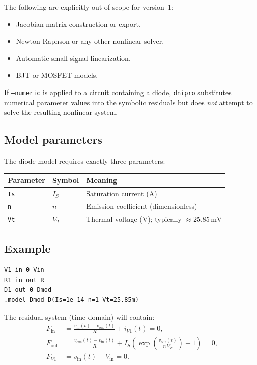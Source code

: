 \documentclass[11pt,a4paper]{article}
\newcommand{\project}{\texttt{dnipro}}
\newcommand{\code}[1]{\texttt{#1}}
\begin{document}
The following are explicitly out of scope for version~1:
\begin{itemize}[noitemsep]
    \item Jacobian matrix construction or export.
    \item Newton-Raphson or any other nonlinear solver.
    \item Automatic small-signal linearization.
    \item BJT or MOSFET models.
\end{itemize}

If \code{--numeric} is applied to a circuit containing a diode,
\project{} substitutes numerical parameter values into the symbolic residuals
but does \emph{not} attempt to solve the resulting nonlinear system.

\subsection{Model parameters}

The diode model requires exactly three parameters:

\begin{center}
\begin{tabular}{llp{}}
\toprule
Parameter & Symbol & Meaning \\
\midrule
\code{Is} & \(I_S\) & Saturation current (A) \\
\code{n}  & \(n\)   & Emission coefficient (dimensionless) \\
\code{Vt} & \(V_T\) & Thermal voltage (V); typically \(\approx 25.85\,\text{mV}\) \\
\bottomrule
\end{tabular}
\end{center}

\subsection{Example}

\begin{lstlisting}[language=spice]
V1 in 0 Vin
R1 in out R
D1 out 0 Dmod
.model Dmod D(Is=1e-14 n=1 Vt=25.85m)
\end{lstlisting}

The residual system (time domain) will contain:
\begin{align}
    F_{\mathrm{in}} &=
        \frac{v_{\mathrm{in}}(t) - v_{\mathrm{out}}(t)}{R} + i_{V1}(t) = 0, \\
    F_{\mathrm{out}} &=
        \frac{v_{\mathrm{out}}(t) - v_{\mathrm{in}}(t)}{R}
        + I_S\!\left(\exp\!\left(\frac{v_{\mathrm{out}}(t)}{n\,V_T}\right)-1\right) = 0, \\
    F_{V1} &= v_{\mathrm{in}}(t) - V_{\mathrm{in}} = 0.
\end{align}
\end{document}
